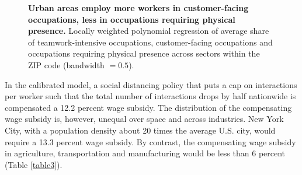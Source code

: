 \begin{figure}[!h]

\caption{{\bf Urban areas employ more workers in customer-facing occupations, less in occupations requiring physical presence.}
Locally weighted polynomial regression of average share of teamwork-intensive occupations, customer-facing occupations and occupations requiring physical presence across sectors within the ZIP code (bandwidth $=0.5$).}
\label{fig4}
\end{figure}

In the calibrated model, a social distancing policy that puts a cap on interactions per worker such that the total number of interactions drops by half nationwide is compensated a 12.2 percent wage subsidy. The distribution of the compensating wage subsidy is, however, unequal over space and across industries. 
New York City, with a population density about 20 times the average U.S. city, would require a 13.3 percent wage subsidy. 
By contrast, the compensating wage subsidy in agriculture, transportation and manufacturing would be less than 6 percent (Table \ref{table3}).

